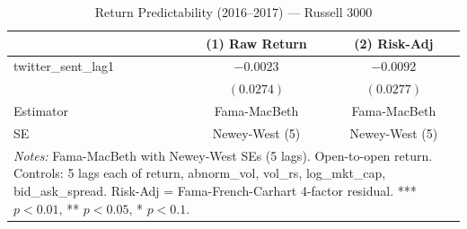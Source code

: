 \begin{table}[htbp]
\centering
\caption{Return Predictability (2016--2017) --- Russell 3000}
\label{tab:russel_2016_t2}
\begin{tabular}{lcc}
\hline\hline
 & (1) Raw Return & (2) Risk-Adj \\
\hline
twitter\_sent\_lag1 & $-0.0023$ & $-0.0092$ \\
                     & $(0.0274)$ & $(0.0277)$ \\
\hline
Estimator & Fama-MacBeth & Fama-MacBeth \\
SE & Newey-West (5) & Newey-West (5) \\
\hline\hline
\multicolumn{3}{p{0.9\linewidth}}{\footnotesize \textit{Notes:} Fama-MacBeth with Newey-West SEs (5 lags). Open-to-open return. Controls: 5 lags each of return, abnorm\_vol, vol\_rs, log\_mkt\_cap, bid\_ask\_spread. Risk-Adj = Fama-French-Carhart 4-factor residual. *** $p<0.01$, ** $p<0.05$, * $p<0.1$.}\n\end{tabular}
\end{table}